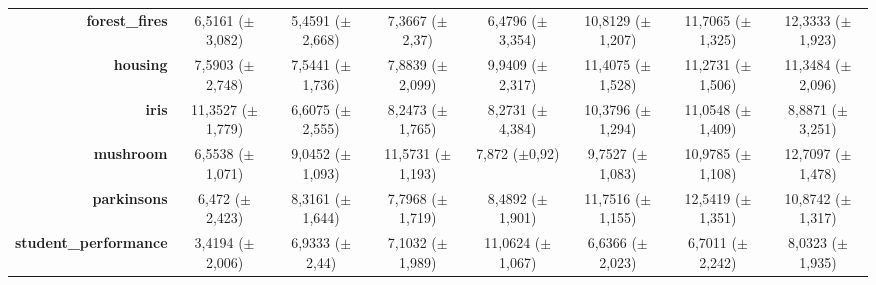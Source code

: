 \documentclass[preprint,review,12pt]{elsarticle}
\begin{document}
\begin{table}[htb]
{\begin{tabular}{r|c|c|ccccc|}
			\textbf{forest\_fires}        & \cellcolor[rgb]{ 1,  .859,  .506}6,5161 ($\pm$3,082)                              & \cellcolor[rgb]{ .898,  .89,  .51}5,4591 ($\pm$2,668)   & \cellcolor[rgb]{ .996,  .796,  .494}7,3667 ($\pm$2,37)   & \cellcolor[rgb]{ 1,  .863,  .51}6,4796 ($\pm$3,354)      & \cellcolor[rgb]{ .98,  .529,  .443}10,8129 ($\pm$1,207)  & \cellcolor[rgb]{ .976,  .463,  .431}11,7065 ($\pm$1,325) & \cellcolor[rgb]{ .973,  .412,  .42}12,3333 ($\pm$1,923)  \\
			\textbf{housing}              & \cellcolor[rgb]{ 1,  .918,  .518}7,5903 ($\pm$2,748)                              & \cellcolor[rgb]{ 1,  .922,  .518}7,5441 ($\pm$1,736)    & \cellcolor[rgb]{ 1,  .878,  .51}7,8839 ($\pm$2,099)      & \cellcolor[rgb]{ .984,  .608,  .459}9,9409 ($\pm$2,317)  & \cellcolor[rgb]{ .973,  .412,  .42}11,4075 ($\pm$1,528)  & \cellcolor[rgb]{ .976,  .431,  .424}11,2731 ($\pm$1,506) & \cellcolor[rgb]{ .976,  .42,  .424}11,3484 ($\pm$2,096)  \\
			\textbf{iris}                 & \cellcolor[rgb]{ .973,  .412,  .42}11,3527 ($\pm$1,779)                           & \cellcolor[rgb]{ 1,  .922,  .518}6,6075 ($\pm$2,555)    & \cellcolor[rgb]{ .992,  .749,  .486}8,2473 ($\pm$1,765)  & \cellcolor[rgb]{ .992,  .745,  .486}8,2731 ($\pm$4,384)  & \cellcolor[rgb]{ .98,  .518,  .443}10,3796 ($\pm$1,294)  & \cellcolor[rgb]{ .976,  .447,  .427}11,0548 ($\pm$1,409) & \cellcolor[rgb]{ .988,  .678,  .471}8,8871 ($\pm$3,251)  \\
			\textbf{mushroom}             & \cellcolor[rgb]{ 1,  .922,  .518}6,5538 ($\pm$1,071)                              & \cellcolor[rgb]{ .992,  .718,  .478}9,0452 ($\pm$1,093) & \cellcolor[rgb]{ .98,  .51,  .439}11,5731 ($\pm$1,193)   & \cellcolor[rgb]{ .996,  .816,  .498}7,872 ($\pm$0,92)    & \cellcolor[rgb]{ .988,  .659,  .471}9,7527 ($\pm$1,083)  & \cellcolor[rgb]{ .98,  .557,  .451}10,9785 ($\pm$1,108)  & \cellcolor[rgb]{ .973,  .412,  .42}12,7097 ($\pm$1,478)  \\
			\textbf{parkinsons}           & \cellcolor[rgb]{ .875,  .882,  .51}6,472 ($\pm$2,423)                             & \cellcolor[rgb]{ .996,  .843,  .506}8,3161 ($\pm$1,644) & \cellcolor[rgb]{ 1,  .898,  .514}7,7968 ($\pm$1,719)     & \cellcolor[rgb]{ .996,  .827,  .502}8,4892 ($\pm$1,901)  & \cellcolor[rgb]{ .98,  .494,  .435}11,7516 ($\pm$1,155)  & \cellcolor[rgb]{ .973,  .412,  .42}12,5419 ($\pm$1,351)  & \cellcolor[rgb]{ .984,  .584,  .455}10,8742 ($\pm$1,317) \\
			\textbf{student\_performance} & \cellcolor[rgb]{ .514,  .78,  .486}3,4194 ($\pm$2,006)                            & \cellcolor[rgb]{ 1,  .902,  .514}6,9333 ($\pm$2,44)     & \cellcolor[rgb]{ 1,  .886,  .514}7,1032 ($\pm$1,989)     & \cellcolor[rgb]{ .98,  .537,  .443}11,0624 ($\pm$1,067)  & \cellcolor[rgb]{ .988,  .918,  .514}6,6366 ($\pm$2,023)  & \cellcolor[rgb]{ 1,  .922,  .518}6,7011 ($\pm$2,242)     & \cellcolor[rgb]{ .996,  .804,  .498}8,0323 ($\pm$1,935)  \\

\end{tabular}}
\end{table}
\end{document}
